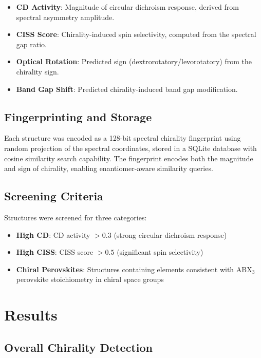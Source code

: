 \documentclass[11pt,a4paper]{article}
\begin{document}
\begin{itemize}[nosep]
\item \textbf{CD Activity}: Magnitude of circular dichroism response, derived from spectral asymmetry amplitude.
\item \textbf{CISS Score}: Chirality-induced spin selectivity, computed from the spectral gap ratio.
\item \textbf{Optical Rotation}: Predicted sign (dextrorotatory/levorotatory) from the chirality sign.
\item \textbf{Band Gap Shift}: Predicted chirality-induced band gap modification.
\end{itemize}

\subsection{Fingerprinting and Storage}

Each structure was encoded as a 128-bit spectral chirality fingerprint using random projection of the spectral coordinates, stored in a SQLite database with cosine similarity search capability. The fingerprint encodes both the magnitude and sign of chirality, enabling enantiomer-aware similarity queries.

\subsection{Screening Criteria}

Structures were screened for three categories:
\begin{itemize}[nosep]
\item \textbf{High CD}: CD activity $> 0.3$ (strong circular dichroism response)
\item \textbf{High CISS}: CISS score $> 0.5$ (significant spin selectivity)
\item \textbf{Chiral Perovskites}: Structures containing elements consistent with ABX$_3$ perovskite stoichiometry in chiral space groups
\end{itemize}

\section{Results}

\subsection{Overall Chirality Detection}
\end{document}
